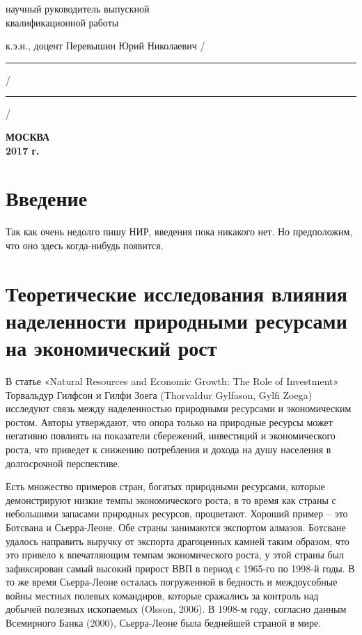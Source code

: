 \documentclass[12pt,a4paper, oneside]{extreport}
\begin{document}
\hfill{}

\noindent
научный руководитель выпускной \\
квалификационной работы

\noindent
к.э.н., доцент Перевышин Юрий Николаевич
\hfill /\rule{6em}{0.5pt}/\rule{6em}{0.5pt}/

\hfill{}

%
%

\vfill

\begin{center}
	\normalsize \bfseries МОСКВА \\ 2017 г.
\end{center}
\endgroup 


\tableofcontents  %

\chapter*{Введение}

Так как очень недолго пишу НИР, введения пока никакого нет. Но предположим, что оно здесь когда-нибудь появится.


\chapter{Теоретические исследования влияния наделенности природными ресурсами на экономический рост}

В статье «Natural Resources and Economic Growth: The Role of Investment» Торвальдур Гилфсон и Гилфи Зоега (Thorvaldur Gylfason, Gylfi Zoega) исследуют связь между наделенностью природными ресурсами и экономическим ростом. Авторы утверждают, что опора только на природные ресурсы может негативно повлиять на показатели сбережений, инвестиций и экономического роста, что приведет к снижению потребления и дохода на душу населения в долгосрочной перспективе. 

Есть множество примеров стран, богатых природными ресурсами, которые демонстрируют низкие темпы экономического роста, в то время как страны с небольшими запасами природных ресурсов, процветают. Хороший пример – это Ботсвана и Сьерра-Леоне. Обе страны занимаются экспортом алмазов. Ботсване удалось направить выручку от экспорта драгоценных камней таким образом, что это привело к впечатляющим темпам экономического роста, у этой страны был зафиксирован самый высокий прирост ВВП в период с 1965-го по 1998-й годы. В то же время Сьерра-Леоне осталась погруженной в бедность и междоусобные войны местных полевых командиров, которые сражались за контроль над добычей полезных ископаемых (Olsson, 2006). В 1998-м году, согласно данным Всемирного Банка (2000), Сьерра-Леоне была беднейшей страной в мире. 
\end{document}
